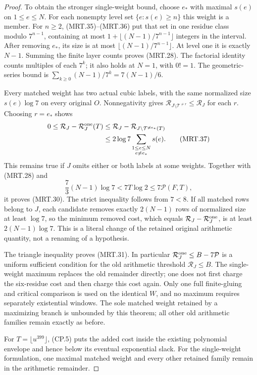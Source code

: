 \begin{proof}
To obtain the stronger single-weight bound, choose $e_*$ with maximal
$s(e)$ on $1\leq e\leq N$.  For each nonempty level set
$\{e:s(e)\geq n\}$ this weight is a member.  For $n\geq2$,
(MRT.35)--(MRT.36) put that set in one residue class modulo
$7^{n-1}$, containing at most $1+\lfloor(N-1)/7^{n-1}\rfloor$
integers in the interval.  After removing $e_*$, its size is at
most $\lfloor(N-1)/7^{n-1}\rfloor$.  At level one it is exactly
$N-1$.  Summing the finite layer counts proves (MRT.28).
The factorial identity counts multiples of each $7^k$; it also
holds at $N=1$, with $0!=1$.  The geometric-series bound is
$\sum_{k\geq0}(N-1)/7^k=7(N-1)/6$.

Every matched weight has two actual cubic labels, with the same
normalized size $s(e)\log7$ on every original $O$.
Nonnegativity gives
$\mathcal R_{J\setminus\mathcal T^{\ne r}}\leq\mathcal R_J$
for each $r$.  Choosing $r=e_*$ shows
\[
 \begin{split}
 0\leq\mathcal R_J-\mathcal R_J^{\rm one}(T)
 &\leq\mathcal R_J-
           \mathcal R_{J\setminus\mathcal T^{\ne e_*}(T)}\\
 &\leq2\log7\sum_{\substack{1\leq e\leq N\\e\ne e_*}}s(e).
 \end{split}                                                   \tag{MRT.37}
\]
This remains true if $J$ omits either or both labels at some weights.
Together with (MRT.28) and
\[
 \frac73(N-1)\log7<7T\log2\leq7\mathcal P(F,T),
 \tag{MRT.38}
\]
it proves (MRT.30).  The strict inequality follows from $7<8$.
If all matched rows belong to $J$, each candidate removes exactly
$2(N-1)$ rows of normalized size at least $\log7$, so the minimum
removed cost, which equals $\mathcal R_J-\mathcal R_J^{\rm one}$,
is at least $2(N-1)\log7$.  This is a literal change of the retained
original arithmetic quantity, not a renaming of a hypothesis.

The triangle inequality proves (MRT.31).  In particular
$\mathcal R_J^{\rm one}\leq B-7\mathcal P$ is a uniform sufficient
condition for the old arithmetic threshold $\mathcal R_J\leq B$.
The single-weight maximum replaces the old remainder directly;
one does not first charge the six-residue cost and then charge this
cost again.  Only one full finite-gluing and critical comparison is
used on the identical $W$, and no maximum requires separately
existential windows.  The sole matched weight retained by a maximizing
branch is unbounded by this theorem; all other old arithmetic
families remain exactly as before.

For $T=\lfloor u^{399}\rfloor$, (CP.5) puts the added cost inside
the existing polynomial envelope and hence below its eventual
exponential slack.  For the single-weight formulation, one maximal
matched weight and
every other retained family remain in the arithmetic remainder.
\end{proof}

